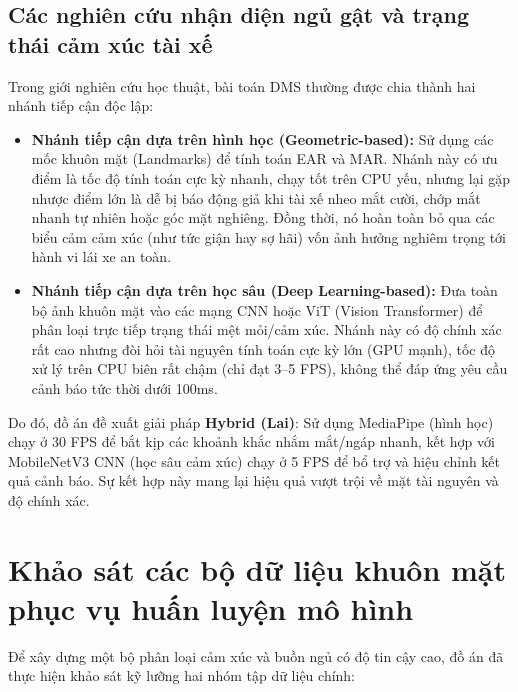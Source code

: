 \documentclass[../DoAn.tex]{subfiles}
\begin{document}
\subsection{Các nghiên cứu nhận diện ngủ gật và trạng thái cảm xúc tài xế}
Trong giới nghiên cứu học thuật, bài toán DMS thường được chia thành hai nhánh tiếp cận độc lập:
\begin{itemize}
    \item \textbf{Nhánh tiếp cận dựa trên hình học (Geometric-based):} Sử dụng các mốc khuôn mặt (Landmarks) để tính toán EAR và MAR. Nhánh này có ưu điểm là tốc độ tính toán cực kỳ nhanh, chạy tốt trên CPU yếu, nhưng lại gặp nhược điểm lớn là dễ bị báo động giả khi tài xế nheo mắt cười, chớp mắt nhanh tự nhiên hoặc góc mặt nghiêng. Đồng thời, nó hoàn toàn bỏ qua các biểu cảm cảm xúc (như tức giận hay sợ hãi) vốn ảnh hưởng nghiêm trọng tới hành vi lái xe an toàn.
    \item \textbf{Nhánh tiếp cận dựa trên học sâu (Deep Learning-based):} Đưa toàn bộ ảnh khuôn mặt vào các mạng CNN hoặc ViT (Vision Transformer) để phân loại trực tiếp trạng thái mệt mỏi/cảm xúc. Nhánh này có độ chính xác rất cao nhưng đòi hỏi tài nguyên tính toán cực kỳ lớn (GPU mạnh), tốc độ xử lý trên CPU biên rất chậm (chỉ đạt 3--5 FPS), không thể đáp ứng yêu cầu cảnh báo tức thời dưới 100ms.
\end{itemize}

Do đó, đồ án đề xuất giải pháp \textbf{Hybrid (Lai)}: Sử dụng MediaPipe (hình học) chạy ở 30 FPS để bắt kịp các khoảnh khắc nhắm mắt/ngáp nhanh, kết hợp với MobileNetV3 CNN (học sâu cảm xúc) chạy ở 5 FPS để bổ trợ và hiệu chỉnh kết quả cảnh báo. Sự kết hợp này mang lại hiệu quả vượt trội về mặt tài nguyên và độ chính xác.

\section{Khảo sát các bộ dữ liệu khuôn mặt phục vụ huấn luyện mô hình}
\label{section:2.2}
Để xây dựng một bộ phân loại cảm xúc và buồn ngủ có độ tin cậy cao, đồ án đã thực hiện khảo sát kỹ lưỡng hai nhóm tập dữ liệu chính:
\end{document}
